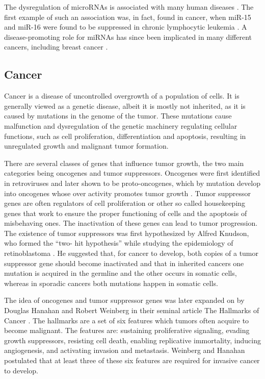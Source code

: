 The dysregulation of microRNAs is associated with many human diseases
\citep{Jiang2009,VAIHDATÄMÄREFE}. The first example of such an association was, in
fact, found in cancer, when miR-15 and miR-16 were found to be suppressed in
chronic lymphocytic leukemia \citep{Musilova2015}. A disease-promoting role
for miRNAs has since been implicated in many different cancers, including
breast cancer \citep{Melo2011}.









\subsection{Cancer}\label{cancer}

Cancer is a disease of uncontrolled overgrowth of a population of cells. It is
generally viewed as a genetic disease, albeit it is mostly not inherited, as it is
caused by  mutations in the genome of the tumor. These mutations cause malfunction
and dysregulation of the genetic machinery regulating cellular functions, such
as cell proliferation, differentiation and apoptosis, resulting in
unregulated growth and malignant tumor formation.

There are several classes of genes that influence tumor growth, the two main
categories being oncogenes and tumor suppressors. Oncogenes were first
identified in retroviruses and later shown to be proto-oncogenes, which by
mutation develop into oncogenes whose over activity promotes tumor growth
\citep{Varmus1988}. Tumor suppressor genes are often regulators of cell
proliferation or other so called housekeeping genes that work to ensure the
proper functioning of cells and the apoptosis of misbehaving ones. The
inactivation of these genes can lead to tumor progression. The existence of
tumor suppressors was first hypothesized by Alfred Knudson, who formed the “two-
hit hypothesis” while studying the epidemiology of retinoblastoma
\citep{Knudson1971}. He suggested that, for cancer to develop, both copies of
a tumor suppressor gene should become inactivated and that in inherited
cancers one mutation is acquired in the germline and the other occurs in
somatic cells, whereas in sporadic cancers both mutations happen in somatic
cells.

The idea of oncogenes and tumor suppressor genes was later expanded on by
Douglas Hanahan and Robert Weinberg in their seminal article The Hallmarks of
Cancer \citep{Hanahan2000}. The hallmarks are a set of six features which
tumors often acquire to become malignant. The features are: sustaining
proliferative signaling, evading growth suppressors, resisting cell death,
enabling replicative immortality, inducing angiogenesis, and activating
invasion and metastasis. Weinberg and Hanahan postulated that at least three
of these six features are required for invasive cancer to develop.

